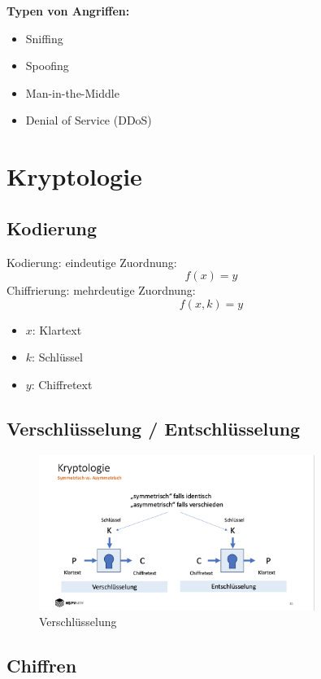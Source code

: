 \documentclass[a4paper,12pt]{article}
\begin{document}
\vspace{0.5em}
\noindent\textbf{Typen von Angriffen:}
\begin{itemize}
    \item Sniffing
    \item Spoofing
    \item Man-in-the-Middle
    \item Denial of Service (DDoS)
\end{itemize}

\section{Kryptologie}

\subsection{Kodierung}
\noindent Kodierung: eindeutige Zuordnung:
\[
f(x) = y
\]
Chiffrierung: mehrdeutige Zuordnung:
\[
f(x, k) = y
\]

\begin{itemize}
    \item \(x\): Klartext
    \item \(k\): Schlüssel
    \item \(y\): Chiffretext
\end{itemize}

\subsection{Verschlüsselung / Entschlüsselung}
\begin{figure}[H]
    \centering
    \includegraphics[width=0.8\textwidth]{bilder/verschluesselung.png}
    \caption{Verschlüsselung}
    \label{fig:encript}
\end{figure}

\subsection{Chiffren}
\end{document}
